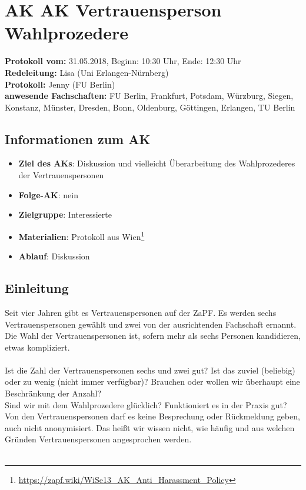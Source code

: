 
\section{AK AK Vertrauensperson Wahlprozedere}

  \textbf{Protokoll vom:} 31.05.2018, %
  Beginn: 10:30 Uhr, %
  Ende: 12:30 Uhr \\ %
  \textbf{Redeleitung:} Lisa (Uni Erlangen-Nürnberg) \\
  \textbf{Protokoll:} Jenny (FU Berlin) \\
  \textbf{anwesende Fachschaften:} FU Berlin, Frankfurt, Potsdam, Würzburg, Siegen, Konstanz, Münster, Dresden, Bonn, Oldenburg, Göttingen, Erlangen, TU Berlin

  \subsection*{Informationen zum AK}
    \begin{itemize}
      \item \textbf{Ziel des AKs}: Diskussion und vielleicht Überarbeitung des Wahlprozederes der Vertrauenspersonen
      \item \textbf{Folge-AK}: nein
      \item \textbf{Zielgruppe}: Interessierte
      \item \textbf{Materialien}: Protokoll aus Wien\footnote{\url{https://zapf.wiki/WiSe13_AK_Anti_Harassment_Policy}}
      \item \textbf{Ablauf}: Diskussion
    \end{itemize}

  \subsection*{Einleitung}
    Seit vier Jahren gibt es Vertrauenspersonen auf der ZaPF. Es werden sechs Vertrauenspersonen gewählt und zwei von der ausrichtenden Fachschaft ernannt. Die Wahl der Vertrauenspersonen ist, sofern mehr als sechs Personen kandidieren, etwas kompliziert. \\ \\

    Ist die Zahl der Vertrauenspersonen sechs und zwei gut? Ist das zuviel (beliebig) oder zu wenig (nicht immer verfügbar)? Brauchen oder wollen wir überhaupt eine Beschränkung der Anzahl? \\
    Sind wir mit dem Wahlprozedere glücklich? Funktioniert es in der Praxis gut? \\
    Von den Vertrauenspersonen darf es keine Besprechung oder Rückmeldung geben, auch nicht anonymisiert. Das heißt wir wissen nicht, wie häufig und aus welchen Gründen Vertrauenspersonen angesprochen werden. \\ \\

